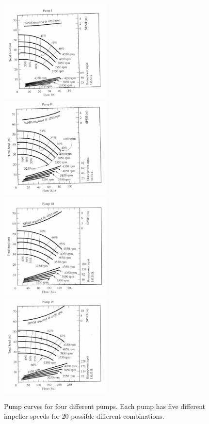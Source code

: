 \documentclass[11pt]{article}
\begin{document}
\begin{enumerate}
\begin{figure}[h]
\centering
\includegraphics[width=0.5\textwidth]{pump1.pdf}%
\includegraphics[width=0.5\textwidth]{pump2.pdf}\\%
\includegraphics[width=0.5\textwidth]{pump3.pdf}%
\includegraphics[width=0.5\textwidth]{pump4.pdf}%
\caption{Pump curves for four different pumps.  Each pump has five different impeller speeds for 20 possible different combinations.}
\label{fig:pumps}
\end{figure}
\clearpage


\end{enumerate}
\end{document}
